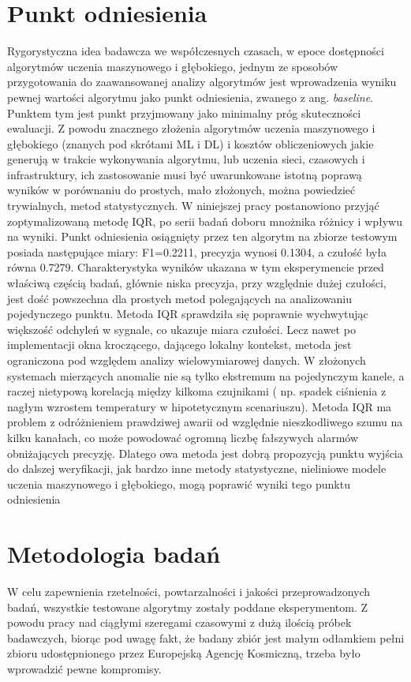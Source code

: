 \documentclass[a4paper,twoside,12pt]{book}
\newcommand{\obcy}[1]{\emph{#1}}
\newcommand{\english}[1]{{\selectlanguage{british}\obcy{#1}}}
\begin{document}
\section{Punkt odniesienia}

Rygorystyczna idea badawcza we współczesnych czasach, w epoce dostępności algorytmów uczenia maszynowego i głębokiego, jednym ze sposobów przygotowania do zaawansowanej analizy algorytmów jest wprowadzenia wyniku pewnej wartości algorytmu jako punkt odniesienia, zwanego z ang. \english{baseline}. Punktem tym jest punkt przyjmowany jako minimalny próg skuteczności ewaluacji. Z powodu znacznego złożenia algorytmów uczenia maszynowego i głębokiego (znanych pod skrótami ML i DL) i kosztów obliczeniowych jakie generują w trakcie wykonywania algorytmu, lub uczenia sieci, czasowych i infrastruktury, ich zastosowanie musi być uwarunkowane istotną poprawą wyników w porównaniu do prostych, mało złożonych, można powiedzieć trywialnych, metod statystycznych. 
W niniejszej pracy postanowiono przyjąć zoptymalizowaną metodę IQR, po serii badań doboru mnożnika różnicy i wpływu na wyniki. Punkt odniesienia osiągnięty przez ten algorytm na zbiorze testowym posiada następujące miary: F1=0.2211, precyzja wynosi 0.1304, a czułość była równa 0.7279.
Charakterystyka wyników ukazana w tym eksperymencie przed właściwą częścią badań, głównie niska precyzja, przy względnie dużej czułości, jest dość powszechna dla prostych metod polegających na analizowaniu pojedynczego punktu. Metoda IQR sprawdziła się poprawnie wychwytując większość odchyleń w sygnale, co ukazuje miara czułości. Lecz nawet po implementacji okna kroczącego, dającego lokalny kontekst, metoda jest ograniczona pod względem analizy wielowymiarowej danych. W złożonych systemach mierzących anomalie nie są tylko ekstremum na pojedynczym kanele, a raczej nietypową korelacją między kilkoma czujnikami ( np. spadek ciśnienia z nagłym wzrostem temperatury w hipotetycznym scenariuszu). Metoda IQR ma problem z odróżnieniem prawdziwej awarii od względnie nieszkodliwego szumu na kilku kanałach, co może powodować ogromną liczbę fałszywych alarmów obniżających precyzję. Dlatego owa metoda jest dobrą propozycją punktu wyjścia do dalszej weryfikacji, jak bardzo inne metody statystyczne, nieliniowe modele uczenia maszynowego i głębokiego, mogą poprawić wyniki tego punktu odniesienia 


\section{Metodologia badań}
W celu zapewnienia rzetelności, powtarzalności i jakości przeprowadzonych badań, wszystkie testowane algorytmy zostały poddane eksperymentom. Z powodu pracy nad ciągłymi szeregami czasowymi z dużą ilością próbek badawczych, biorąc pod uwagę fakt, że badany zbiór jest małym odłamkiem pełni zbioru udostępnionego przez Europejską Agencję Kosmiczną, trzeba było wprowadzić pewne kompromisy. 
\end{document}
